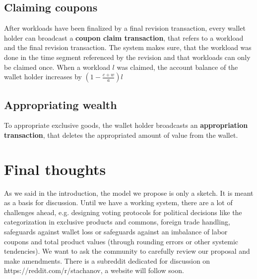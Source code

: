 \documentclass[11pt]{article}
\begin{document}
\subsection{Claiming coupons}

After workloads have been finalized by a final revision transaction, every wallet holder can broadcast a \textbf{coupon claim transaction}, that refers to a workload and the final revision transaction. The system makes sure, that the workload was done in the time segment referenced by the revision and that workloads can only be claimed once. When a workload $l$ was claimed, the account balance of the wallet holder increases by $(1-\frac{c+w}{a})l$ 

\subsection{Appropriating wealth}

To appropriate exclusive goods, the wallet holder broadcasts an \textbf{appropriation transaction}, that deletes the appropriated amount of value from the wallet. 

\section{Final thoughts}

As we said in the introduction, the model we propose is only a sketch. It is meant as a basis for discussion. Until we have a working system, there are a lot of challenges ahead, e.g. designing voting protocols for political decisions like the categorization in exclusive products and commons, foreign trade handling, safeguards against wallet loss or safeguards against an imbalance of labor coupons and total product values (through rounding errors or other systemic tendencies). We want to ask the community to carefully review our proposal and make amendments. There is a subreddit dedicated for discussion on https://reddit.com/r/stachanov, a website will follow soon.
\end{document}
